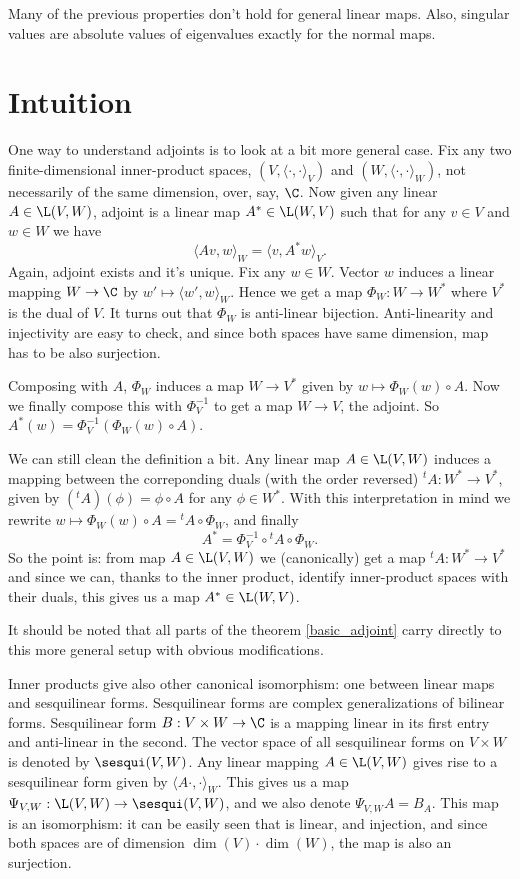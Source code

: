 Many of the previous properties don't hold for general linear maps. Also, singular values are absolute values of eigenvalues exactly for the normal maps.


\section{Intuition}

One way to understand adjoints is to look at a bit more general case. Fix any two finite-dimensional inner-product spaces, $(V, \langle \cdot, \cdot \rangle_{V})$ and $(W, \langle \cdot, \cdot \rangle_{W})$, not necessarily of the same dimension, over, say, $\C$.
Now given any linear $A \in \L(V, W)$, adjoint is a linear map $A^{*} \in \L(W, V)$ such that for any $v \in V$ and $w \in W$ we have
\[
	\langle A v, w \rangle_{W} = \langle v, A^{*} w \rangle_{V}.
\]
Again, adjoint exists and it's unique. Fix any $w \in W$. Vector $w$ induces a linear mapping $W \to \C$ by $w' \mapsto \langle w', w \rangle_{W}$. Hence we get a map $\Phi_{W} : W \to W^{*}$ where $V^{*}$ is the dual of $V$. It turns out that $\Phi_{W}$ is anti-linear bijection. Anti-linearity and injectivity are easy to check, and since both spaces have same dimension, map has to be also surjection.

Composing with $A$, $\Phi_{W}$ induces a map $W \to V^{*}$ given by $w \mapsto \Phi_{W}(w) \circ A$. Now we finally compose this with $\Phi^{-1}_{V}$ to get a map $W \to V$, the adjoint. So $A^{*}(w) = \Phi^{-1}_{V}(\Phi_{W}(w) \circ A)$.

We can still clean the definition a bit. Any linear map $A \in \L(V, W)$ induces a mapping between the correponding duals (with the order reversed) ${}^{t}A : W^{*} \to V^{*}$, given by $({}^{t}A)(\phi) = \phi \circ A$ for any $\phi \in W^{*}$. With this interpretation in mind we rewrite $w \mapsto \Phi_{W}(w) \circ A = {}^{t}A \circ \Phi_{W}$, and finally
\[
	A^{*} = \Phi^{-1}_{V} \circ {}^{t} A \circ \Phi_{W}.
\]
So the point is: from map $A \in \L(V, W)$ we (canonically) get a map ${}^{t}A : W^{*} \to V^{*}$ and since we can, thanks to the inner product, identify inner-product spaces with their duals, this gives us a map $A^{*} \in \L(W,V)$.

It should be noted that all parts of the theorem \ref{basic_adjoint} carry directly to this more general setup with obvious modifications.

Inner products give also other canonical isomorphism: one between linear maps and sesquilinear forms. Sesquilinear forms are complex generalizations of bilinear forms. Sesquilinear form $B : V \times W \to \C$ is a mapping linear in its first entry and anti-linear in the second. The vector space of all sesquilinear forms on $V \times W$ is denoted by $\sesqui(V, W)$. Any linear mapping $A \in \L(V, W)$ gives rise to a sesquilinear form given by $\langle A \cdot, \cdot \rangle_{W}$. This gives us a map $\Psi_{V, W} : \L(V, W) \to \sesqui(V, W)$, and we also denote $\Psi_{V, W} A = B_{A}$. This map is an isomorphism: it can be easily seen that is linear, and injection, and since both spaces are of dimension $\dim(V) \cdot \dim(W)$, the map is also an surjection.


